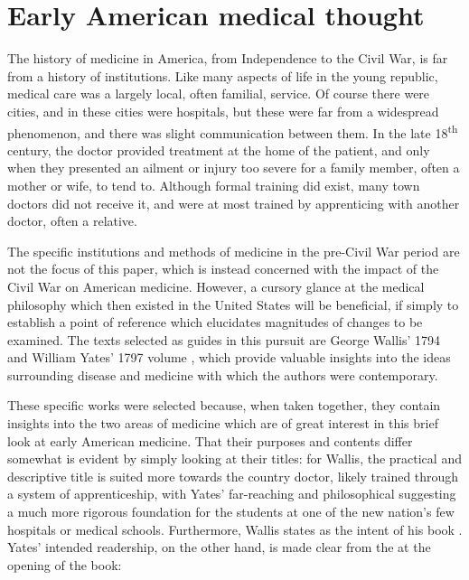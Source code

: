 \documentclass[12pt]{article}
\begin{document}
\renewcommand{\thesec}{Early American medical thought}
\section{\thesec} \label{sec:early}
The history of medicine in America, from Independence to the Civil War, is far from a history of institutions. Like many aspects of life in the young republic,
medical care was a largely local, often familial, service. Of course there were cities, and in these cities were hospitals, but these were far from a widespread
phenomenon, and there was slight communication between them. In the late 18\textsuperscript{th} century, the doctor provided treatment at the home of the patient, and
only when they presented an ailment or injury too severe for a family member, often a mother or wife, to tend to. Although formal training did exist, many town
doctors did not receive it, and were at most trained by apprenticing with another doctor, often a relative.\autocite[Although far from offering a complete survey of
	early American medicine,][gives an insightful look into percisely this local nature.]{ulrich1991midwife}

The specific institutions and methods of medicine in the pre-Civil War period are not the focus of this paper, which is instead
concerned with the impact of the Civil War on American medicine. However, a cursory glance at the medical philosophy which then
existed in the United States will be beneficial, if simply to establish a point of reference which elucidates magnitudes of
changes to be examined. The texts selected as guides in this pursuit are George Wallis' 1794 
and William Yates' 1797 volume , which provide valuable insights into the ideas surrounding disease and
medicine with which the authors were contemporary.\autocites{Wallis1794}{yates1797}

These specific works were selected because, when taken together, they contain insights into the two areas of medicine which are
of great interest in this brief look at early American medicine. That their purposes and contents differ somewhat is evident
by simply looking at their titles: for Wallis, the practical and descriptive title  is suited more towards the
country doctor, likely trained through a system of apprenticeship, with Yates' far-reaching and philosophical 
suggesting a much more rigorous foundation for the students at one of the new nation's few hospitals or medical schools. Furthermore,
Wallis states as the intent of his book \autocite[\textit{Explanatory Preface}, X]{Wallis1794}. Yates' intended readership, on the other hand, is made clear
from the  at the opening of the book: \autocite[\textit{Advertisement}]{yates1797}
\end{document}
